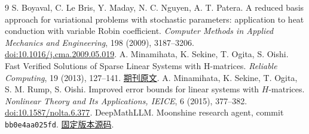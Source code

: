 \begin{thebibliography}{9}\small
{}
S. Boyaval, C. Le Bris, Y. Maday, N. C. Nguyen, A. T. Patera.
A reduced basis approach for variational problems with stochastic parameters: application to heat conduction with variable Robin coefficient.
\emph{Computer Methods in Applied Mechanics and Engineering}, 198 (2009), 3187--3206.
\href{https://doi.org/10.1016/j.cma.2009.05.019}{doi:10.1016/j.cma.2009.05.019}.
A. Minamihata, K. Sekine, T. Ogita, S. Oishi.
Fast Verified Solutions of Sparse Linear Systems with H-matrices.
\emph{Reliable Computing}, 19 (2013), 127--141.
\href{https://interval.louisiana.edu/reliable-computing-journal/volume-19/reliable-computing-19-pp-127-141.pdf}{期刊原文}.
A. Minamihata, K. Sekine, T. Ogita, S. M. Rump, S. Oishi.
Improved error bounds for linear systems with $H$-matrices.
\emph{Nonlinear Theory and Its Applications, IEICE}, 6 (2015), 377--382.
\href{https://doi.org/10.1587/nolta.6.377}{doi:10.1587/nolta.6.377}.
DeepMathLLM. Moonshine research agent, commit \texttt{bb0e4aa025fd}.
\href{https://github.com/DeepMathLLM/Moonshine/tree/bb0e4aa025fdcc5297fff1025ab4876f120ed615}{固定版本源码}.
\end{thebibliography}

